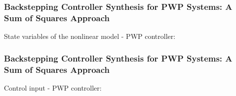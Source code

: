 \documentclass{beamer}
\begin{document}
\frame
  {
    \frametitle{Backstepping Controller Synthesis for PWP Systems: A Sum of Squares Approach}
State variables of the nonlinear model - PWP controller:
\centerline{}    
}

\frame
  {
    \frametitle{Backstepping Controller Synthesis for PWP Systems: A Sum of Squares Approach}
Control input - PWP controller:
\centerline{}    
}
  
\end{document}
